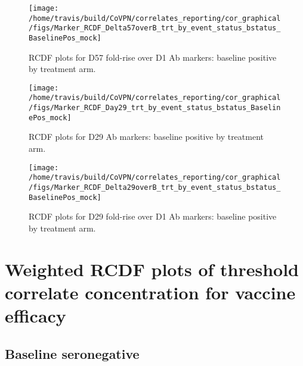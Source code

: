 \documentclass[]{book}
\theoremstyle{definition}
\theoremstyle{definition}
\theoremstyle{definition}
\newcommand{\1}{\mathbbm{1}}
\begin{document}
\clearpage
\begin{figure}[H]

{\centering \texttt{[image: /home/travis/build/CoVPN/correlates\_reporting/cor\_graphical/figs/Marker\_RCDF\_Delta57overB\_trt\_by\_event\_status\_bstatus\_BaselinePos\_mock]} 

}

\caption{RCDF plots for D57 fold-rise over D1 Ab markers: baseline positive by treatment arm.}\label{fig:unnamed-chunk-18}
\end{figure}

\clearpage
\begin{figure}[H]

{\centering \texttt{[image: /home/travis/build/CoVPN/correlates\_reporting/cor\_graphical/figs/Marker\_RCDF\_Day29\_trt\_by\_event\_status\_bstatus\_BaselinePos\_mock]} 

}

\caption{RCDF plots for D29 Ab markers: baseline positive by treatment arm.}\label{fig:unnamed-chunk-19}
\end{figure}

\clearpage
\begin{figure}[H]

{\centering \texttt{[image: /home/travis/build/CoVPN/correlates\_reporting/cor\_graphical/figs/Marker\_RCDF\_Delta29overB\_trt\_by\_event\_status\_bstatus\_BaselinePos\_mock]} 

}

\caption{RCDF plots for D29 fold-rise over D1 Ab markers: baseline positive by treatment arm.}\label{fig:unnamed-chunk-20}
\end{figure}

\clearpage

\hypertarget{weighted-rcdf-plots-of-threshold-correlate-concentration-for-vaccine-efficacy}{%
\section{Weighted RCDF plots of threshold correlate concentration for vaccine efficacy}\label{weighted-rcdf-plots-of-threshold-correlate-concentration-for-vaccine-efficacy}}

\hypertarget{baseline-seronegative-2}{%
\subsection{Baseline seronegative}\label{baseline-seronegative-2}}
\end{document}
